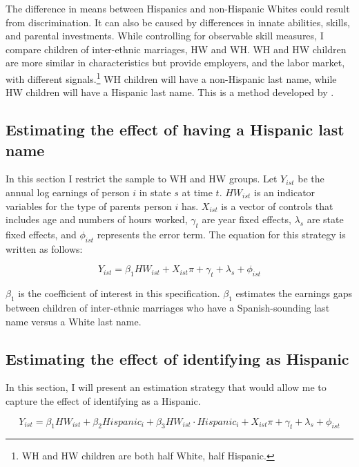 \documentclass{wptemp}
\begin{document}
The difference in means between Hispanics and non-Hispanic Whites could result from discrimination. It can also be caused by differences in innate abilities, skills, and parental investments. While controlling for observable skill measures, I compare children of inter-ethnic marriages, HW and WH. WH and HW children are more similar in characteristics but provide employers, and the labor market, with different signals.\footnote{WH and HW children are both half White, half Hispanic.} WH children will have a non-Hispanic last name, while HW children will have a Hispanic last name. This is a method developed by \citet{rubinstein2014pride}.

\subsection{Estimating the effect of having a Hispanic last name}

In this section I restrict the sample to WH and HW groups. Let $Y_{ist}$ be the annual log earnings of person $i$ in state $s$ at time $t$. $HW_{ist}$ is an indicator variables for the type of parents person $i$ has. $X_{ist}$ is a vector of controls that includes age and numbers of hours worked, $\gamma_{t}$ are year fixed effects, $\lambda_{s}$ are state fixed effects, and $\phi_{ist}$ represents the error term. The equation for this strategy is written as follows:

\begin{equation} \label{eq:1a}
Y_{ist} = \beta_{1} HW_{ist} + X_{ist} \pi + \gamma_{t} + \lambda_s + \phi_{ist}
\end{equation}

$\beta_{1}$ is the coefficient of interest in this specification. $\beta_{1}$ estimates the earnings gaps between children of inter-ethnic marriages who have a Spanish-sounding last name versus a White last name. 

\subsection{Estimating the effect of identifying as Hispanic}

In this section, I will present an estimation strategy that would allow me to capture the effect of identifying as a Hispanic. 

\begin{equation} \label{eq:iden}
Y_{ist} = \beta_{1} HW_{ist} + \beta_{2} Hispanic_i + \beta_{3} HW_{ist} \cdot Hispanic_i + X_{ist} \pi + \gamma_{t} + \lambda_s + \phi_{ist}
\end{equation}
\end{document}
